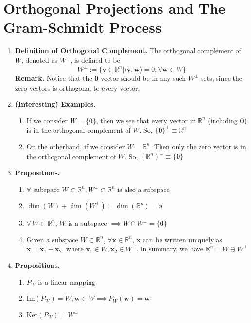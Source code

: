 \documentclass[oneside, 12pt]{book}
\newcommand{\settag}[1]{\renewcommand{\theenumi}{#1}}
\newcommand{\R}{\mathbb{R}}
\newcommand{\tbf}[1]{\textbf{#1}}
\newcommand{\para}[1]{\item \tbf{#1}}
\newcommand{\vv}{\mathbf{v}}
\newcommand{\vw}{\mathbf{w}}
\newcommand{\vx}{\mathbf{x}}
\newcommand{\vzero}{\mathbf{0}}
\begin{document}
\section{Orthogonal Projections and The Gram-Schmidt Process}
\begin{enumerate}
    \settag{4.4.1}
    \para{Definition of Orthogonal Complement.} The orthogonal complement of $W$, denoted as 
    $W^{\perp}$, is defined to be
    \begin{equation*}
        W^\perp := \{\vv\in \R^n | \langle \vv,\vw\rangle = 0, \forall \vw \in W\}
    \end{equation*}
    \textbf{Remark.} Notice that the $\vzero$ vector should be in any such $W^\perp$ sets, 
    since the zero vectors is orthogonal to every vector.
    
    \settag{4.4.2}
    \para{(Interesting) Examples.}
    \begin{enumerate}
        \item If we consider $W = \{\vzero\}$, then we see that every vector in $\R^n$ (including $\vzero$)
        is in the orthogonal complement of $W$. So, $\{\vzero\}^\perp\equiv \R^n$
        \item On the otherhand, if we consider $W = \R^n$. Then only the zero vector is in the orthogonal 
        complement of $W$. So, $(\R^n)^\perp \equiv \{\vzero\}$
    \end{enumerate}

    \settag{4.4.3}
    \para{Propositions.}
    \begin{enumerate}
        \item $\forall$ subspace $W \subset \R^n, W^\perp\subset \R^n$ is also a subspace
        \item $\dim(W) + \dim(W^\perp) = \dim(\R^n) = n$
        \item $\forall\, W\subset \R^n$, $W$ is a subspace $\implies W \cap W^\perp = \{\vzero\}$
        \item Given a subspace $W\subset \R^n$, $\forall \vx \in \R^n$, $\vx$ can be written 
        uniquely as $\vx = \vx_1 + \vx_2$, where $\vx_1 \in W, \vx_2 \in W^\perp$. In summary, 
        we have $\R^n = W \oplus W^\perp$
    \end{enumerate}
    
    \settag{4.4.5}
    \para{Propositions.}
    \begin{enumerate}
        \item $P_W$ is a linear mapping
        \item Im$(P_W) = W, \vw \in W \implies P_W(\vw) = \vw$
        \item Ker$(P_W) = W^\perp$
    \end{enumerate}
    

\end{enumerate}
\end{document}
